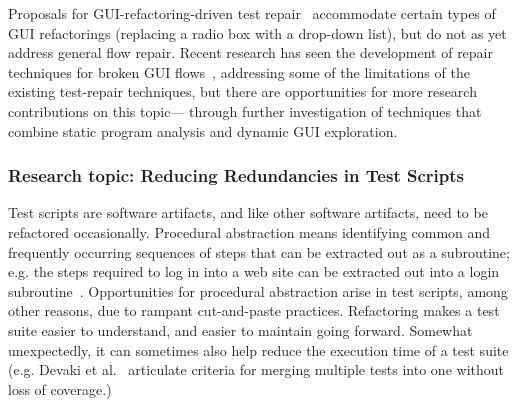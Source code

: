 
Proposals for GUI-refactoring-driven test repair~\cite{Daniel2011} accommodate
certain types of GUI refactorings (\eg replacing a radio box with a drop-down
list), but do not as yet address general flow repair.  Recent research has seen
the development of repair techniques for broken GUI flows~\cite{Zhang2013},
addressing some of the limitations of the existing test-repair techniques, but
there are opportunities for more research contributions on this topic---\eg
through further investigation of techniques that combine static program analysis
and dynamic GUI exploration.

\subsubsection*{Research topic: Reducing Redundancies in Test Scripts}

Test scripts are software artifacts, and like other software artifacts, need to
be refactored occasionally.  Procedural abstraction means
identifying common and frequently occurring sequences of steps that can be
extracted out as a subroutine; e.g. the steps required to log in into a web site
can be extracted out into a login subroutine~\cite{Mahmood-Lau}.  Opportunities for procedural
abstraction arise in test scripts, among other
reasons, due to rampant cut-and-paste practices.  Refactoring makes a
test suite easier to understand, and easier to maintain going forward. Somewhat
unexpectedly, it can sometimes also help reduce the execution time of
a test suite (e.g. Devaki et al.~\cite{Devaki:2013} articulate criteria for
merging multiple tests into one without loss of coverage.)


